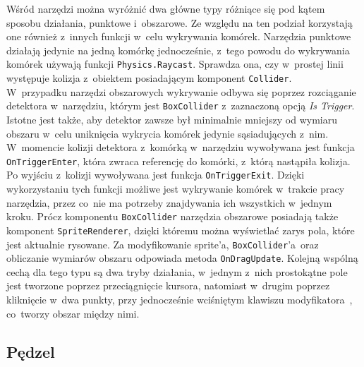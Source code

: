 Wśród narzędzi można wyróżnić dwa główne typy różniące się pod kątem sposobu działania, punktowe i~obszarowe.
Ze względu na ten podział korzystają one również z~innych funkcji w~celu wykrywania komórek.
Narzędzia punktowe działają jedynie na jedną komórkę jednocześnie,
z~tego powodu do wykrywania komórek używają funkcji \texttt{Physics.Raycast}.
Sprawdza ona, czy w~prostej linii występuje kolizja z~obiektem posiadającym komponent \texttt{Collider}.\\
\indent W~przypadku narzędzi obszarowych wykrywanie odbywa się poprzez rozciąganie detektora w~narzędziu,
którym jest \texttt{BoxCollider} z~zaznaczoną opcją \textit{Is Trigger}.
Istotne jest także,
aby detektor zawsze był minimalnie mniejszy od wymiaru obszaru w~celu uniknięcia wykrycia komórek jedynie sąsiadujących z~nim.
%
W~momencie kolizji detektora z~komórką w~narzędziu wywoływana jest funkcja \texttt{OnTriggerEnter},
która zwraca referencję do komórki, z~którą nastąpiła kolizja.
Po wyjściu z~kolizji wywoływana jest funkcja \texttt{OnTriggerExit}.
Dzięki wykorzystaniu tych funkcji możliwe jest wykrywanie komórek w~trakcie pracy narzędzia,
przez co~nie ma potrzeby znajdywania ich wszystkich w~jednym kroku.
Prócz komponentu \texttt{BoxCollider} narzędzia obszarowe posiadają także komponent \texttt{SpriteRenderer},
dzięki któremu można wyświetlać zarys pola, które jest aktualnie rysowane.
Za modyfikowanie sprite'a, \texttt{BoxCollider}'a~oraz obliczanie wymiarów obszaru odpowiada metoda \texttt{OnDragUpdate}. 
Kolejną wspólną cechą dla tego typu są dwa tryby działania,
w~jednym z~nich prostokątne pole jest tworzone poprzez przeciągnięcie kursora,
natomiast w~drugim poprzez kliknięcie w~dwa punkty,
przy jednocześnie wciśniętym klawiszu modyfikatora~, co~tworzy obszar między nimi.

\subsection{Pędzel}
\label{subsec:pedzel}

